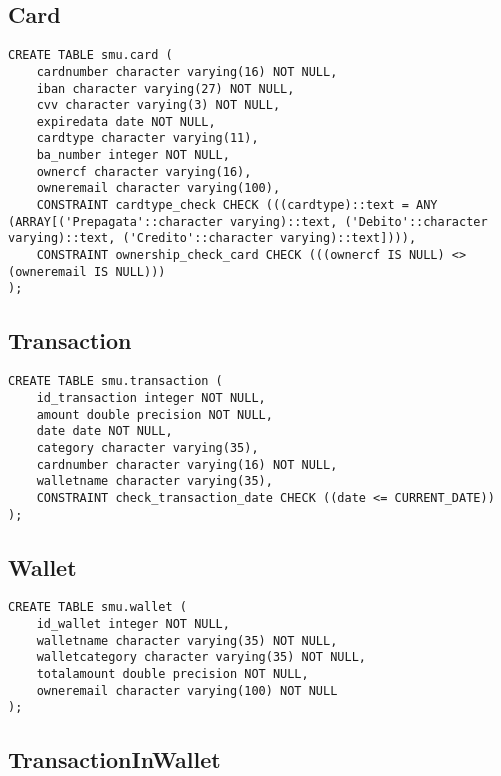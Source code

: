 \subsection{Card}

\begin{lstlisting}[tabsize=2]
CREATE TABLE smu.card (
    cardnumber character varying(16) NOT NULL,
    iban character varying(27) NOT NULL,
    cvv character varying(3) NOT NULL,
    expiredata date NOT NULL,
    cardtype character varying(11),
    ba_number integer NOT NULL,
    ownercf character varying(16),
    owneremail character varying(100),
    CONSTRAINT cardtype_check CHECK (((cardtype)::text = ANY (ARRAY[('Prepagata'::character varying)::text, ('Debito'::character varying)::text, ('Credito'::character varying)::text]))),
    CONSTRAINT ownership_check_card CHECK (((ownercf IS NULL) <> (owneremail IS NULL)))
);
\end{lstlisting}

\subsection{Transaction}

\begin{lstlisting}[tabsize=2]
CREATE TABLE smu.transaction (
    id_transaction integer NOT NULL,
    amount double precision NOT NULL,
    date date NOT NULL,
    category character varying(35),
    cardnumber character varying(16) NOT NULL,
    walletname character varying(35),
    CONSTRAINT check_transaction_date CHECK ((date <= CURRENT_DATE))
);
\end{lstlisting}

\newpage

\subsection{Wallet}

\begin{lstlisting}[tabsize=2]
CREATE TABLE smu.wallet (
    id_wallet integer NOT NULL,
    walletname character varying(35) NOT NULL,
    walletcategory character varying(35) NOT NULL,
    totalamount double precision NOT NULL,
    owneremail character varying(100) NOT NULL
);
\end{lstlisting}

\subsection{TransactionInWallet}

